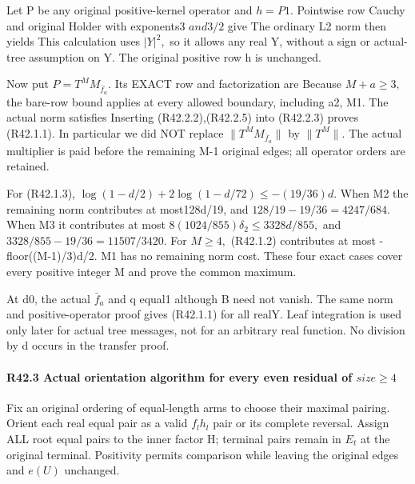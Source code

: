 Let P be any original positive-kernel operator and \(h=P1.\) Pointwise row
Cauchy and original Holder with exponents3 \(and3/2\) give
The ordinary L2 norm then yields
This calculation uses \(|Y|^2,\allowbreak \) so it allows any real Y, without a sign or
actual-tree assumption on Y. The original positive row h is unchanged.

Now put \(P=T^M M_{\bar f_a}.\) Its EXACT row and factorization are
Because \(M+a\ge 3,\allowbreak \) the bare-row bound applies at every allowed boundary,
including a2, M1. The actual norm satisfies
Inserting (R42.2.2),(R42.2.5) into (R42.2.3) proves (R42.1.1). In particular we did NOT
replace \(\lVert T^M M_{\bar f_a}\rVert \) by \(\lVert T^M\rVert .\) The actual multiplier is paid before
the remaining M-1 original edges; all operator orders are retained.

For (R42.1.3), \(\log(1-d/2)+2\log(1-d/72)\le -(19/36)d.\)
When M2 the remaining norm contributes at most128d/19, and
\(128/19-19/36=4247/684.\) When M3 it contributes at most
\(8(1024/855)\delta_2\le 3328d/855,\allowbreak \) and
\(3328/855-19/36=11507/3420.\) For \(M\ge 4,\allowbreak \) (R42.1.2) contributes at most
-floor((M-1)/3)d/2. M1 has no remaining norm cost. These four exact
cases cover every positive integer M and prove the common maximum.

At d0, the actual \(\bar f_a\) and q equal1 although B need not vanish.
The same norm and positive-operator proof gives (R42.1.1) for all realY.
Leaf integration is used only later for actual tree messages, not for an
arbitrary real function. No division by d occurs in the transfer proof.

\paragraph{R42.3 Actual orientation algorithm for every even residual of \(size\ge 4\)}

Fix an original ordering of equal-length arms to choose their maximal
pairing. Orient each real equal pair as a valid \(f_l h_l\) pair or its
complete reversal. Assign ALL root equal pairs to the inner factor H;
terminal pairs remain in \(E_t\) at the original terminal. Positivity permits comparison while leaving the original edges and $e(U)$ unchanged.

